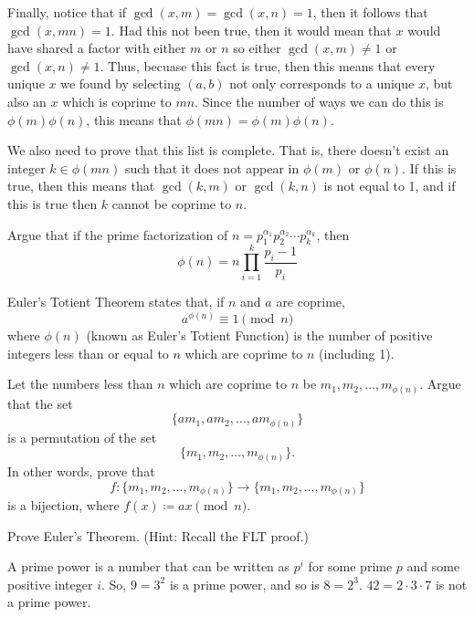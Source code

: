 \documentclass[11pt]{article}
\begin{document}
\begin{Parts}
\begin{solution}
      Finally, notice that if $\gcd(x, m) = \gcd(x, n) = 1$, then it follows that $\gcd(x, mn) = 1$. Had this not been true, then it would mean that $x$ would have shared a factor with either $m$ or $n$ so either $\gcd(x, m) \neq 1$ or $\gcd(x, n) \neq 1$. Thus, becuase this fact is true, then this means that every unique $x$ we found by selecting $(a, b)$ not only corresponds to a unique $x$, but also an $x$ which is coprime to $mn$. Since the number of ways we can do this is $\phi(m)\phi(n)$, this means that $\phi(mn) = \phi(m)\phi(n)$.

      We also need to prove that this list is complete. That is, there doesn't exist an integer $k \in \phi(mn)$ such that it does not appear in $\phi(m)$ or $\phi(n)$. If this is true, then this means that $\gcd(k, m)$ or $\gcd(k, n)$ is not equal to 1, and if this is true then $k$ cannot be coprime to $n$. 

    \end{solution}

    \Part Argue that if the prime factorization of $n = p_1^{\alpha_1} p_2^{\alpha_2} \cdots p_k^{\alpha_k}$, then
    \[ \phi(n) = n \prod_{i = 1}^k \frac{p_i - 1}{p_i} \]

  \end{Parts}


\pagebreak
{}Euler's Totient Theorem states that, if $n$ and $a$ are coprime,
\[
  a^{\phi(n)} \equiv 1 \pmod{n}
\]
where $\phi(n)$ (known as Euler's Totient Function) is the number of positive
integers less than or equal to $n$ which are coprime to $n$ (including 1).

\begin{Parts}
  \Part Let the numbers less than $n$ which are coprime to $n$ be $m_1, m_2, \ldots, m_{\phi(n)}$. 
  Argue that the set
  \[\{am_1, am_2, \ldots, am_{\phi(n)}\}\]
  is a permutation of the set
  \[\{m_1, m_2, \ldots, m_{\phi(n)}\}.\]
  In other words, prove that 
  \[f:\{m_1, m_2, \ldots, m_{\phi(n)}\} \to \{m_1, m_2, \ldots, m_{\phi(n)}\}\]
  is a bijection, where $f(x) \coloneqq ax \pmod{n}$.

  \Part Prove Euler's Theorem. (Hint: Recall the FLT proof.)
\end{Parts}

\pagebreak
{}

A prime power is a number that can be written as $p^i$ for some prime $p$ and some
positive integer $i$. So, $9 = 3^2$ is a prime power, and so is $8 = 2^3$. $42 = 2 \cdot 3 \cdot 7$ is not
a prime power.
\end{document}
